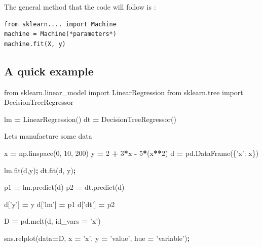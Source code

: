\documentclass[
  letterpaper,
]{scrbook}
\newenvironment{Shaded}{\begin{snugshade}}{\end{snugshade}}
\newcommand{\DecValTok}[1]{\textcolor[rgb]{0.00,0.00,0.81}{#1}}
\newcommand{\ImportTok}[1]{#1}
\newcommand{\NormalTok}[1]{#1}
\newcommand{\OperatorTok}[1]{\textcolor[rgb]{0.81,0.36,0.00}{\textbf{#1}}}
\newcommand{\StringTok}[1]{\textcolor[rgb]{0.31,0.60,0.02}{#1}}
\begin{document}
The general method that the code will follow is :

\begin{verbatim}
from sklearn.... import Machine
machine = Machine(*parameters*)
machine.fit(X, y)
\end{verbatim}

\hypertarget{a-quick-example}{%
\subsection{A quick example}\label{a-quick-example}}

\begin{Shaded}
\begin{Highlighting}[]
\ImportTok{from}\NormalTok{ sklearn.linear_model }\ImportTok{import}\NormalTok{ LinearRegression}
\ImportTok{from}\NormalTok{ sklearn.tree }\ImportTok{import}\NormalTok{ DecisionTreeRegressor}

\NormalTok{lm }\OperatorTok{=}\NormalTok{ LinearRegression()}
\NormalTok{dt }\OperatorTok{=}\NormalTok{ DecisionTreeRegressor()}
\end{Highlighting}
\end{Shaded}

Lets manufacture some data

\begin{Shaded}
\begin{Highlighting}[]
\NormalTok{x }\OperatorTok{=}\NormalTok{ np.linspace(}\DecValTok{0}\NormalTok{, }\DecValTok{10}\NormalTok{, }\DecValTok{200}\NormalTok{)}
\NormalTok{y }\OperatorTok{=} \DecValTok{2} \OperatorTok{+} \DecValTok{3}\OperatorTok{*}\NormalTok{x }\OperatorTok{-} \DecValTok{5}\OperatorTok{*}\NormalTok{(x}\OperatorTok{**}\DecValTok{2}\NormalTok{)}
\NormalTok{d }\OperatorTok{=}\NormalTok{ pd.DataFrame(\{}\StringTok{'x'}\NormalTok{: x\})}

\NormalTok{lm.fit(d,y)}\OperatorTok{;}
\NormalTok{dt.fit(d, y)}\OperatorTok{;}

\NormalTok{p1 }\OperatorTok{=}\NormalTok{ lm.predict(d)}
\NormalTok{p2 }\OperatorTok{=}\NormalTok{ dt.predict(d)}

\NormalTok{d[}\StringTok{'y'}\NormalTok{] }\OperatorTok{=}\NormalTok{ y}
\NormalTok{d[}\StringTok{'lm'}\NormalTok{] }\OperatorTok{=}\NormalTok{ p1}
\NormalTok{d[}\StringTok{'dt'}\NormalTok{] }\OperatorTok{=}\NormalTok{ p2}

\NormalTok{D }\OperatorTok{=}\NormalTok{ pd.melt(d, id_vars }\OperatorTok{=} \StringTok{'x'}\NormalTok{)}

\NormalTok{sns.relplot(data}\OperatorTok{=}\NormalTok{D, x }\OperatorTok{=} \StringTok{'x'}\NormalTok{, y }\OperatorTok{=} \StringTok{'value'}\NormalTok{, hue }\OperatorTok{=} \StringTok{'variable'}\NormalTok{)}\OperatorTok{;}
\end{Highlighting}
\end{Shaded}
\end{document}
